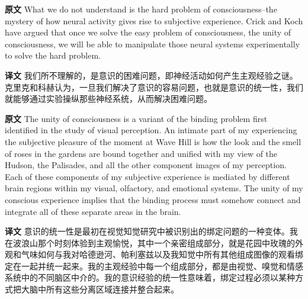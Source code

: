 \documentclass[UTF8,zihao=-4]{ctexart}
\newcommand{\BodyFont}{\fontsize{10.5pt}{15.5pt}\selectfont}
\newcommand{\origlabel}{\textbf{原文}\quad}
\newcommand{\translabel}{\textbf{译文}\quad}
\newenvironment{enblock}{\par\noindent\begingroup\BodyFont\origlabel}{\par\endgroup}
\newenvironment{zhblock}{\par\noindent\begingroup\BodyFont\translabel}{\par\endgroup\vspace{0.35em}}
\begin{document}
\begin{enblock}
What we do not understand is the hard problem of consciousness--the mystery of how neural activity gives rise to subjective experience. Crick and Koch have argued that once we solve the easy problem of consciousness, the unity of consciousness, we will be able to manipulate those neural systems experimentally to solve the hard problem.
\end{enblock}
\begin{zhblock}
我们所不理解的，是意识的困难问题，即神经活动如何产生主观经验之谜。克里克和科赫认为，一旦我们解决了意识的容易问题，也就是意识的统一性，我们就能够通过实验操纵那些神经系统，从而解决困难问题。\end{zhblock}

\begin{enblock}
The unity of consciousness is a variant of the binding problem first identified in the study of visual perception. An intimate part of my experiencing the subjective pleasure of the moment at Wave Hill is how the look and the smell of roses in the gardens are bound together and unified with my view of the Hudson, the Palisades, and all the other component images of my perception. Each of these components of my subjective experience is mediated by different brain regions within my visual, olfactory, and emotional systems. The unity of my conscious experience implies that the binding process must somehow connect and integrate all of these separate areas in the brain.
\end{enblock}
\begin{zhblock}
意识的统一性是最初在视觉知觉研究中被识别出的绑定问题的一种变体。我在波浪山那个时刻体验到主观愉悦，其中一个亲密组成部分，就是花园中玫瑰的外观和气味如何与我对哈德逊河、帕利塞兹以及我知觉中所有其他组成图像的观看绑定在一起并统一起来。我的主观经验中每一个组成部分，都是由视觉、嗅觉和情感系统中的不同脑区中介的。我的意识经验的统一性意味着，绑定过程必须以某种方式把大脑中所有这些分离区域连接并整合起来。\end{zhblock}
\end{document}
